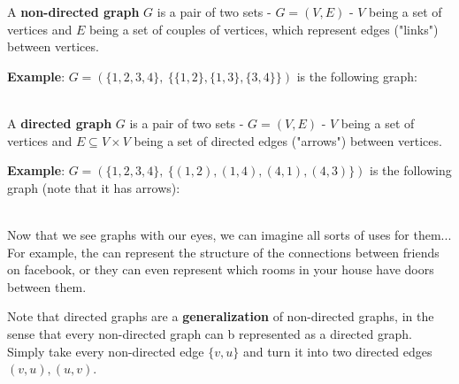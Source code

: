 \begin{definition}
A \textbf{non-directed graph} $G$ is a pair of two sets - $G=(V, E)$ - $V$ being a set of vertices and $E$ being a set of couples of vertices, which represent edges ("links") between vertices.
\end{definition}

\textbf{Example}: $G = (\{1,2,3,4\},\ \{\{1,2\}, \{1,3\}, \{3,4\}\})$ is the following graph:\\ \\

\begin{definition}
A \textbf{directed graph} $G$ is a pair of two sets - $G=(V, E)$ - $V$ being a set of vertices and $E\subseteq V\times V$ being a set of directed edges ("arrows") between vertices.
\end{definition}

\textbf{Example}: $G=(\{1,2,3,4\},\ \{(1, 2), (1, 4), (4, 1), (4,3)\})$ is the following graph (note that it has arrows): \\ \\

Now that we see graphs with our eyes, we can imagine all sorts of uses for them... For example, the can represent the structure of the connections between friends on facebook, or they can even represent which rooms in your house have doors between them.

\begin{remark}
Note that directed graphs are a \textbf{generalization} of non-directed graphs, in the sense that every non-directed graph can b represented as a directed graph. Simply take every non-directed edge $\{v,u\}$ and turn it into two directed edges $(v,u), (u,v)$. 
\end{remark}

